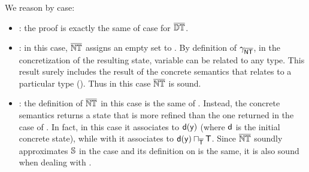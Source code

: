 \documentclass{llncs}
\begin{document}
\begin{lemma}
\label{lemma:notandtypesemantics}
We reason by case:
\begin{itemize}
\item {}: the proof is exactly the same of case  for $\overline{\mathit{\mathbb{DT}}}$.
\item {}: in this case, $\overline{\mathit{\mathbb{NT}}}$ assigns an empty set to . By definition of $\gamma_{\mathsf{\overline{NT}}}$, in the concretization of the resulting state, variable  can be related to any type. This result surely includes the result of the concrete semantics that relates  to a particular type (). Thus in this case $\overline{\mathit{\mathbb{NT}}}$ is sound.
\item {}: the definition of $\overline{\mathit{\mathbb{NT}}}$ in this case is the same of . Instead, the concrete semantics returns a state that is more refined than the one returned in the case of . In fact, in this case it associates  to $\mathsf{d}(\mathsf{y})$ (where $\mathsf{d}$ is the initial concrete state), while with  it associates  to $\mathsf{d}(\mathsf{y}) \sqcap_{\mathsf{\overline{T}}} \mathsf{T}$. Since $\overline{\mathit{\mathbb{NT}}}$ soundly approximates $\mathit{\mathbb{S}}$ in the case  and its definition on  is the same, it is also sound when dealing with .


\end{itemize}
\end{lemma}
\end{document}
